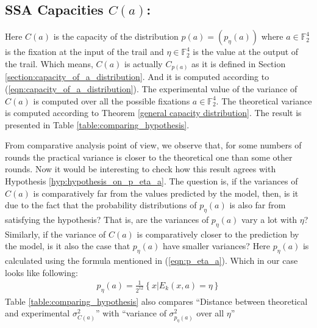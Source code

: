 \subsection{SSA Capacities $C(a)$:}
Here $C(a)$ is the capacity of the distribution $p\left(a\right) = \left(p_{\eta}\left(a\right)\right)$ where $a \in \mathbb{F}_2^4$ is the fixation at the input of the trail and $\eta \in \mathbb{F}_2^4$ is the value at the output of the trail. Which means, $C(a)$ is actually $C_{p\left(a\right)}$ as it is defined in Section \ref{section:capacity_of_a_distribution}. And it is computed according to (\ref{eqn:capacity_of_a_distribution}). The experimental value of the variance of $C(a)$ is computed over all the possible fixations $a \in \mathbb{F}_2^4$. The theoretical variance is computed according to Theorem \ref{general capacity distribution}. The result is presented in Table \ref{table:comparing_hypothesis}. \par \noindent From comparative analysis point of view, we observe that, for some numbers of rounds the practical variance is closer to the theoretical one than some other rounds. Now it would be interesting to check how this result agrees with Hypothesis \ref{hyp:hypothesis_on_p_eta_a}. The question is, if the variances of $C(a)$ is  comparatively far from the values predicted by the model, then, is it due to the fact that the probability distributions of $p_{\eta}(a)$ is also far from satisfying the hypothesis? That is, are the variances of  $p_{\eta}(a)$ vary a lot with $\eta$? Similarly, if the variance of $C(a)$ is comparatively closer to the prediction by the model, is it also the case that $p_{\eta}(a)$ have smaller variances? Here $p_{\eta}\left(a\right)$ is calculated using the formula mentioned in (\ref{eqn:p_eta_a}). Which in our case looks like following:
\begin{eqnarray*}
p_{\eta}\left(a\right) = \frac{1}{2^{12}}\left\lbrace x | E_k\left(x,a\right) = \eta  \right\rbrace
\end{eqnarray*}
Table \ref{table:comparing_hypothesis} also compares ``Distance between theoretical and experimental $\sigma^2_{C(a)}$'' with ``variance of $\sigma^2_{p_{\eta}(a)}$ over all $\eta$''
\pagebreak
